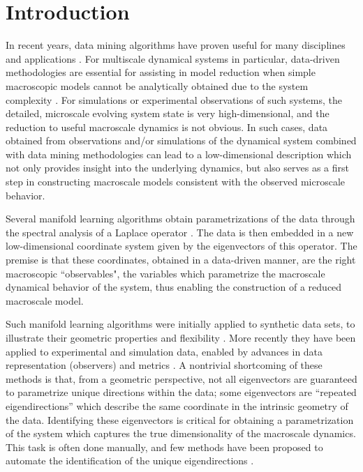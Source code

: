 \documentclass[3p]{elsarticle}
\begin{document}
\section{Introduction}

In recent years, data mining algorithms have proven useful for many disciplines and applications \cite{gepshtein2013image, fernandez2014diffusion, singer2011viewing, yuan2014automated, zhao2003face, trapnell2014dynamics, kemelmacher2011exploring, sifre2013rotation}.
%
For multiscale dynamical systems in particular, data-driven methodologies are essential for
assisting in model reduction when simple macroscopic models cannot be analytically obtained
due to the system complexity \cite{talmon2014intrinsic,berry2013time,singer2009detecting,ferguson2010systematic}.
%
For simulations or experimental observations of such systems, the detailed, microscale evolving system state is
very high-dimensional, and the reduction to useful macroscale dynamics is not obvious.
%
In such cases, data obtained from observations and/or simulations of the dynamical system combined with
data mining methodologies can lead to a low-dimensional description which not only provides insight into the underlying dynamics, but also serves as a first step in constructing macroscale models consistent with the observed microscale behavior.

%
Several manifold learning algorithms obtain parametrizations of the data through
the spectral analysis of a Laplace operator \cite{Belkin2003,coifman2005geometric,coifman2006geometric,singer2008non}.
%
The data is then embedded in a new low-dimensional coordinate system
given by the eigenvectors of this operator.
%
The premise is that these coordinates, obtained in a data-driven manner, are the right macroscopic ``observables",
the variables which parametrize the macroscale dynamical behavior of the system, thus enabling the construction of a reduced macroscale model.

Such manifold learning algorithms were initially applied to synthetic data sets, to illustrate
their geometric properties and flexibility \cite{coifman2005geometric, nadler2006diffusion}.
%
More recently they have been applied to experimental and simulation data,
enabled by advances in data representation (observers) and
metrics \cite{rubner2000earth,mallat2012group,talmon2013empirical,zhao2014rotationally, rohrdanz2011determination}.
%
A nontrivial shortcoming of these methods is that, from a geometric perspective,
not all eigenvectors are guaranteed to parametrize unique directions within the data;
some eigenvectors are ``repeated eigendirections'' which describe the same coordinate in the intrinsic geometry
of the data.
%
Identifying these eigenvectors is critical for obtaining a
parametrization of the system which captures the true dimensionality of the macroscale dynamics.
%
This task is often done manually, and few methods have been proposed to automate the identification of the unique eigendirections \cite{gerber2007robust}.
\end{document}
